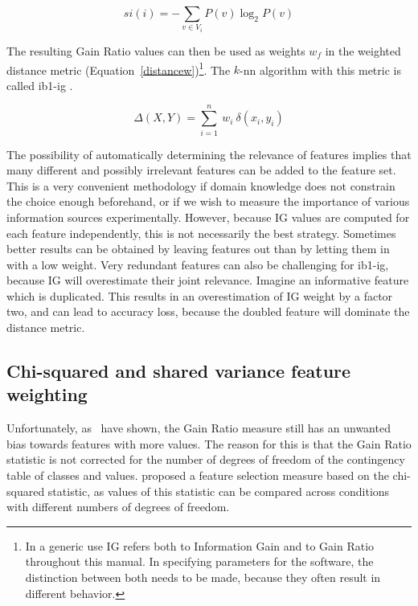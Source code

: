 \documentclass{book}
\begin{document}
\begin{equation}
si(i) = - \sum_{v \in V_{i}} P(v) \log_{2} P(v)
\label{splitinfo}
\end{equation}

The resulting Gain Ratio values can then be used as weights $w_{f}$ in
the weighted distance metric (Equation~\ref{distancew})\footnote{In a
generic use IG refers both to Information Gain and to Gain Ratio
throughout this manual. In specifying parameters for the software, the
distinction between both needs to be made, because they often result
in different behavior.}. The $k$-{\sc nn} algorithm with this
metric is called {\sc ib1-ig} \cite{Daelemans+92b}.

\begin{equation}
\Delta(X,Y) = \sum_{i=1}^{n}\ w_{i} \ \delta(x_{i},y_{i})
\label{distancew}
\end{equation} 

The possibility of automatically determining the relevance of features
implies that many different and possibly irrelevant features can be
added to the feature set. This is a very convenient methodology if
domain knowledge does not constrain the choice enough beforehand, or
if we wish to measure the importance of various information sources
experimentally. However, because IG values are computed for each
feature independently, this is not necessarily the best
strategy. Sometimes better results can be obtained by leaving features
out than by letting them in with a low weight. Very redundant features
can also be challenging for {\sc ib1-ig}, because IG will overestimate
their joint relevance. Imagine an informative feature which is
duplicated. This results in an overestimation of IG weight by a factor
two, and can lead to accuracy loss, because the doubled feature will
dominate the distance metric.

\subsection{Chi-squared and shared variance feature weighting}
\label{chisquared}

Unfortunately, as~ have shown, the Gain Ratio measure
still has an unwanted bias towards features with more values. The
reason for this is that the Gain Ratio statistic is not corrected for
the number of degrees of freedom of the contingency table of classes
and values.  proposed a feature selection measure based
on the chi-squared statistic, as values of this statistic can be
compared across conditions with different numbers of degrees of
freedom.
\end{document}
